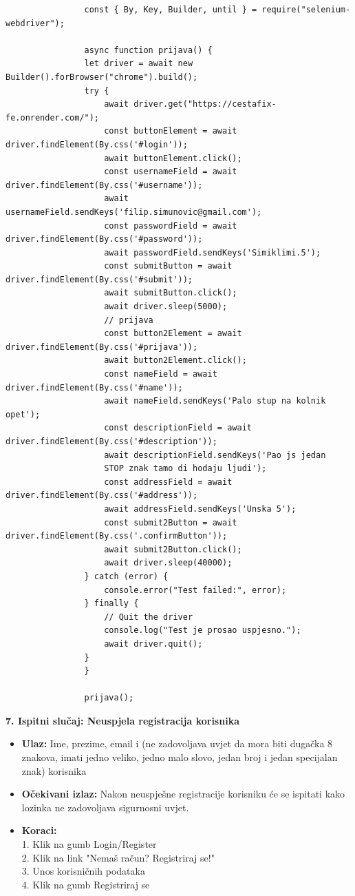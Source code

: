 			\begin{verbatim}
				const { By, Key, Builder, until } = require("selenium-webdriver");

				async function prijava() {
				let driver = await new Builder().forBrowser("chrome").build();
				try {
					await driver.get("https://cestafix-fe.onrender.com/");
					const buttonElement = await driver.findElement(By.css('#login'));
					await buttonElement.click();
					const usernameField = await driver.findElement(By.css('#username'));
					await usernameField.sendKeys('filip.simunovic@gmail.com');
					const passwordField = await driver.findElement(By.css('#password'));
					await passwordField.sendKeys('Simiklimi.5');
					const submitButton = await driver.findElement(By.css('#submit'));
					await submitButton.click();
					await driver.sleep(5000);
					// prijava
					const button2Element = await driver.findElement(By.css('#prijava'));
					await button2Element.click();
					const nameField = await driver.findElement(By.css('#name'));
					await nameField.sendKeys('Palo stup na kolnik opet');
					const descriptionField = await driver.findElement(By.css('#description'));
					await descriptionField.sendKeys('Pao js jedan 
					STOP znak tamo di hodaju ljudi');
					const addressField = await driver.findElement(By.css('#address'));
					await addressField.sendKeys('Unska 5');
					const submit2Button = await driver.findElement(By.css('.confirmButton'));
					await submit2Button.click();
					await driver.sleep(40000);
				} catch (error) {
					console.error("Test failed:", error);
				} finally {
					// Quit the driver
					console.log("Test je prosao uspjesno.");
					await driver.quit();
				}
				}

				prijava();
			\end{verbatim}


			
			\textbf{7. Ispitni slučaj: Neuspjela registracija korisnika}
			 \begin{itemize}
				\item \textbf{Ulaz:} Ime, prezime, email i  (ne zadovoljava uvjet da mora biti dugačka 8 znakova, imati jedno veliko, jedno malo slovo, jedan broj i jedan specijalan znak) korisnika
				\item \textbf{Očekivani izlaz:} Nakon neuspješne registracije korisniku će se ispitati kako lozinka ne zadovoljava sigurnosni uvjet.
				\item \textbf{Koraci:} 
				\\ 1. Klik na gumb Login/Register
				\\ 2. Klik na link "Nemaš račun? Registriraj se!"
				\\ 3. Unos korisničnih podataka
				\\ 4. Klik na gumb Registriraj se
			\end{itemize}

